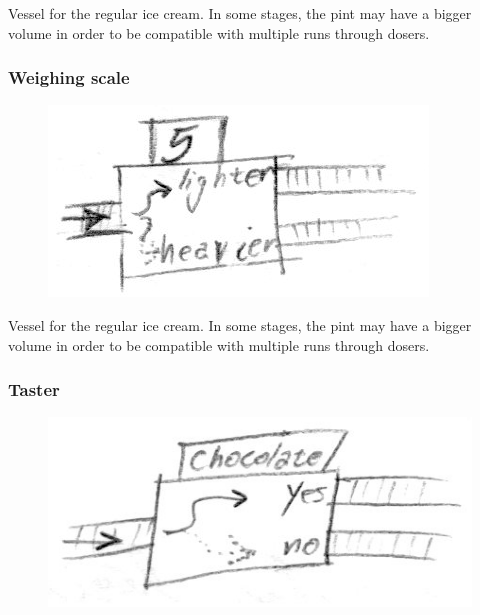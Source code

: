 \documentclass[a4paper]{scrartcl}
\begin{document}
            Vessel for the regular ice cream. In some stages, the pint may have
            a bigger volume in order to be compatible with multiple runs through
            dosers.

        \subsubsection{Weighing scale}
            \begin{figure}
                \vspace{-20pt}
                \includegraphics[scale=1]{devices/scale}
                \vspace{-20pt}
            \end{figure}
            
            Vessel for the regular ice cream. In some stages, the pint may have
            a bigger volume in order to be compatible with multiple runs through
            dosers.

        \subsubsection{Taster}
            \begin{figure}
                \vspace{-20pt}
                \includegraphics[scale=1]{devices/taster}
                \vspace{-20pt}
            \end{figure}
            
\end{document}
